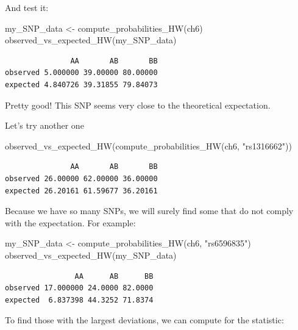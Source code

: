 \documentclass[
  letterpaper,
  DIV=11,
  numbers=noendperiod]{scrreprt}
\newenvironment{Shaded}{\begin{snugshade}}{\end{snugshade}}
\newcommand{\FunctionTok}[1]{\textcolor[rgb]{0.28,0.35,0.67}{#1}}
\newcommand{\NormalTok}[1]{\textcolor[rgb]{0.00,0.23,0.31}{#1}}
\newcommand{\OtherTok}[1]{\textcolor[rgb]{0.00,0.23,0.31}{#1}}
\newcommand{\StringTok}[1]{\textcolor[rgb]{0.13,0.47,0.30}{#1}}
\begin{document}
And test it:

\begin{Shaded}
\begin{Highlighting}[]
\NormalTok{my\_SNP\_data }\OtherTok{\textless{}{-}} \FunctionTok{compute\_probabilities\_HW}\NormalTok{(ch6)}
\FunctionTok{observed\_vs\_expected\_HW}\NormalTok{(my\_SNP\_data)}
\end{Highlighting}
\end{Shaded}

\begin{verbatim}
               AA       AB       BB
observed 5.000000 39.00000 80.00000
expected 4.840726 39.31855 79.84073
\end{verbatim}

Pretty good! This SNP seems very close to the theoretical expectation.

Let's try another one

\begin{Shaded}
\begin{Highlighting}[]
\FunctionTok{observed\_vs\_expected\_HW}\NormalTok{(}\FunctionTok{compute\_probabilities\_HW}\NormalTok{(ch6, }\StringTok{"rs1316662"}\NormalTok{))}
\end{Highlighting}
\end{Shaded}

\begin{verbatim}
               AA       AB       BB
observed 26.00000 62.00000 36.00000
expected 26.20161 61.59677 36.20161
\end{verbatim}

Because we have so many SNPs, we will surely find some that do not
comply with the expectation. For example:

\begin{Shaded}
\begin{Highlighting}[]
\NormalTok{my\_SNP\_data }\OtherTok{\textless{}{-}} \FunctionTok{compute\_probabilities\_HW}\NormalTok{(ch6, }\StringTok{"rs6596835"}\NormalTok{)}
\FunctionTok{observed\_vs\_expected\_HW}\NormalTok{(my\_SNP\_data)}
\end{Highlighting}
\end{Shaded}

\begin{verbatim}
                AA      AB      BB
observed 17.000000 24.0000 82.0000
expected  6.837398 44.3252 71.8374
\end{verbatim}

To find those with the largest deviations, we can compute for the
statistic:
\end{document}
